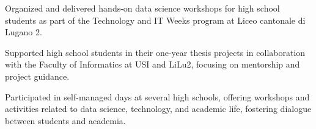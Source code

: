 

Organized and delivered hands-on data science workshops for high school students as part of the Technology and IT Weeks program at Liceo cantonale di Lugano 2.

Supported high school students in their one-year thesis projects in collaboration with the Faculty of Informatics at USI and LiLu2, focusing on mentorship and project guidance.

Participated in self-managed days at several high schools, offering workshops and activities related to data science, technology, and academic life, fostering dialogue between students and academia.